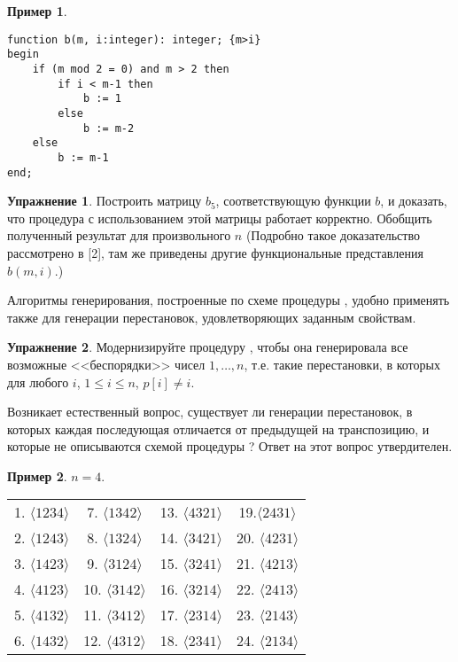 \documentclass[12pt,a4paper]{article}
\theoremstyle{plain}
\theoremstyle{definition}
\newtheorem*{task}{Упражнение}
\newtheorem*{example}{Пример}
\theoremstyle{remark}
\begin{document}
\begin{example}
~
\begin{verbatim}
function b(m, i:integer): integer; {m>i}
begin
    if (m mod 2 = 0) and m > 2 then
        if i < m-1 then
            b := 1
        else
            b := m-2
    else
        b := m-1
end;
\end{verbatim}
\end{example}

\begin{task}
Построить матрицу $b_5$, соответствующую функции $b$, и доказать, что процедура \verb@PERM@ с использованием этой матрицы работает корректно.
Обобщить полученный результат для произвольного $n$ (Подробно такое доказательство рассмотрено в [2], там же приведены другие функциональные представления $b(m,i)$.)
\end{task}

Алгоритмы генерирования, построенные по схеме процедуры \verb@perm@, удобно применять также для генерации перестановок, удовлетворяющих заданным свойствам.

\begin{task}
Модернизируйте процедуру \verb@perm@, чтобы она генерировала все возможные <<беспорядки>> чисел $1,\ldots,n$, т.е. такие перестановки, в которых для любого $i$, $1\le i\le n$, $p[i]\ne i$.
\end{task}

Возникает естественный вопрос, существует ли генерации перестановок, в которых каждая последующая отличается от предыдущей на транспозицию, и которые не описываются схемой процедуры \verb@perm@? Ответ на этот вопрос утвердителен.

\begin{example}
$n=4$.

\begin{tabular}{cccc}
1. $\langle1 2 3 4\rangle$ & 7. $\langle1 3 4 2\rangle$ & 13. $\langle4 3 2 1\rangle$ & 19.$\langle 2 4 3 1\rangle$ \\
2. $\langle1 2 4 3\rangle$ & 8. $\langle1 3 2 4\rangle$ & 14. $\langle3 4 2 1\rangle$ & 20. $\langle4 2 3 1\rangle$ \\
3. $\langle1 4 2 3\rangle$ & 9. $\langle3 1 2 4\rangle$ & 15. $\langle3 2 4 1\rangle$ & 21. $\langle4 2 1 3\rangle$ \\
4. $\langle4 1 2 3\rangle$ & 10. $\langle3 1 4 2\rangle$ & 16. $\langle3 2 1 4\rangle$ & 22. $\langle2 4 1 3\rangle$ \\
5. $\langle4 1 3 2\rangle$ & 11. $\langle3 4 1 2\rangle$ & 17. $\langle2 3 1 4\rangle$ & 23. $\langle2 1 4 3\rangle$ \\
6. $\langle1 4 3 2\rangle$ & 12. $\langle4 3 1 2\rangle$ & 18. $\langle2 3 4 1\rangle$ & 24. $\langle2 1 3 4\rangle$ \\
\end{tabular}
\end{example}
\end{document}
